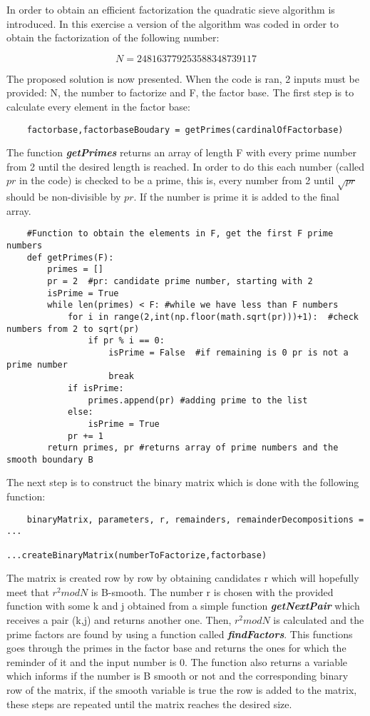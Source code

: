 \documentclass{article}
\begin{document}
In order to obtain an efficient factorization the quadratic sieve algorithm is introduced. In this exercise a version of the algorithm was coded in order to obtain the factorization of the following number:

$$N = 248163779253588348739117$$

The proposed solution is now presented. When the code is ran, 2 inputs must be provided: N, the number to factorize and F, the factor base. The first step is to calculate every element in the factor base:

\begin{verbatim}
    factorbase,factorbaseBoudary = getPrimes(cardinalOfFactorbase)
\end{verbatim}

The function \textit{\textbf{getPrimes}} returns an array of length F with every prime number from 2 until the desired length is reached. In order to do this each number (called $pr$ in the code) is checked to be a prime, this is, every number from 2 until $\sqrt{pr}$ should be non-divisible by $pr$. If the number is prime it is added to the final array.

\begin{verbatim}
    #Function to obtain the elements in F, get the first F prime numbers
    def getPrimes(F):  
        primes = []
        pr = 2  #pr: candidate prime number, starting with 2
        isPrime = True
        while len(primes) < F: #while we have less than F numbers
            for i in range(2,int(np.floor(math.sqrt(pr)))+1):  #check numbers from 2 to sqrt(pr)
                if pr % i == 0:
                    isPrime = False  #if remaining is 0 pr is not a prime number
                    break
            if isPrime:
                primes.append(pr) #adding prime to the list
            else:
                isPrime = True
            pr += 1
        return primes, pr #returns array of prime numbers and the smooth boundary B
\end{verbatim}

The next step is to construct the binary matrix which is done with the following function:

\begin{verbatim}
    binaryMatrix, parameters, r, remainders, remainderDecompositions = ...
                                         ...createBinaryMatrix(numberToFactorize,factorbase)
\end{verbatim}

The matrix is created row by row by obtaining candidates r which will hopefully meet that $r^2 mod N$ is B-smooth. The number r is chosen with the provided function with some k and j obtained from a simple function \textbf{\textit{getNextPair}} which receives a pair (k,j) and returns another one. Then, $r^2 mod N$ is calculated and the prime factors are found by using a function called \textit{\textbf{findFactors}}. This functions goes through the primes in the factor base and returns the ones for which the reminder of it and the input number is 0. The function also returns a variable which informs if the number is B smooth or not and the corresponding binary row of the matrix, if the smooth variable is true the row is added to the matrix, these steps are repeated until the matrix reaches the desired size.  
\end{document}
